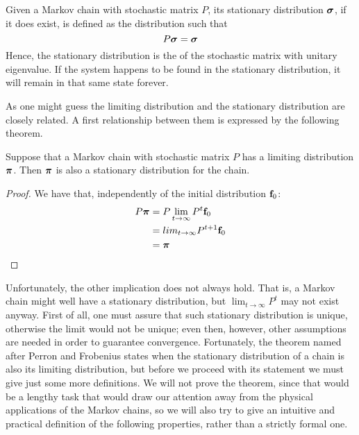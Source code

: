 \begin{ndef} 
    Given a Markov chain with stochastic matrix $P$, its stationary distribution $\boldsymbol{\sigma}$, if it does exist, is defined as the distribution such that 
    \begin{equation}
        P \boldsymbol{\sigma} = \boldsymbol{\sigma}
    \end{equation}
    Hence, the stationary distribution is the  of the stochastic matrix with unitary eigenvalue. If the system happens to be found in the stationary distribution, it will remain in that same state forever.
\end{ndef}
As one might guess the limiting distribution and the stationary distribution are closely related. A first relationship between them is expressed by the following theorem.

\begin{theorem}
    Suppose that a Markov chain with stochastic matrix $P$ has a limiting distribution $\boldsymbol{\pi}$. Then $\boldsymbol{\pi}$ is also a stationary distribution for the chain.
\end{theorem}
\begin{proof}
    We have that, independently of the initial distribution $\mathbf{f}_0$:
    \begin{align}
        P \boldsymbol{\pi}
            & = P \lim_{t \rightarrow \infty} P^t \mathbf{f}_0 \\
            & = lim_{t \rightarrow \infty} P^{t+1} \mathbf{f}_0 \\
            & = \boldsymbol{\pi}
    \end{align}
\end{proof}
Unfortunately, the other implication does not always hold. That is, a Markov chain might well have a stationary distribution, but $\lim_{t \rightarrow \infty} P^t$ may not exist anyway. First of all, one must assure that such stationary distribution is unique, otherwise the limit would not be unique; even then, however, other assumptions are needed in order to guarantee convergence. Fortunately, the theorem named after Perron and Frobenius states when the stationary distribution of a chain is also its limiting distribution, but before we proceed with its statement we must give just some more definitions. We will not prove the theorem, since that would be a lengthy task that would draw our attention away from the physical applications of the Markov chains, so we will also try to give an intuitive and practical definition of the following properties, rather than a strictly formal one. 

